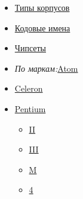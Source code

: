 \documentclass[a4paper,11pt]{article}
\begin{document}
\begin{tabular}
\begin{tabular}
\begin{itemize}
	\item \href{https://ru.wikipedia.org/wiki/%D0%A2%D0%B8%D0%BF%D1%8B_%D0%BA%D0%BE%D1%80%D0%BF%D1%83%D1%81%D0%BE%D0%B2_%D0%BF%D1%80%D0%BE%D1%86%D0%B5%D1%81%D1%81%D0%BE%D1%80%D0%BE%D0%B2}{Типы корпусов}
	\item \href{https://ru.wikipedia.org/wiki/%D0%A1%D0%BF%D0%B8%D1%81%D0%BE%D0%BA_%D0%BA%D0%BE%D0%B4%D0%BE%D0%B2%D1%8B%D1%85_%D0%B8%D0%BC%D1%91%D0%BD_%D0%BF%D1%80%D0%BE%D0%B4%D1%83%D0%BA%D1%86%D0%B8%D0%B8_Intel}{Кодовые имена}
	\item \href{https://ru.wikipedia.org/wiki/%D0%A1%D0%BF%D0%B8%D1%81%D0%BE%D0%BA_%D1%87%D0%B8%D0%BF%D1%81%D0%B5%D1%82%D0%BE%D0%B2_Intel}{Чипсеты}
\end{itemize}
\begin{itemize}
	\item \textit{По маркам:}\href{https://ru.wikipedia.org/w/index.php?title=%D0%A1%D0%BF%D0%B8%D1%81%D0%BE%D0%BA_%D0%BC%D0%B8%D0%BA%D1%80%D0%BE%D0%BF%D1%80%D0%BE%D1%86%D0%B5%D1%81%D1%81%D0%BE%D1%80%D0%BE%D0%B2_Intel_Atom&amp;action=edit&amp;redlink=1}{Atom}
	\item \href{https://ru.wikipedia.org/wiki/%D0%A1%D0%BF%D0%B8%D1%81%D0%BE%D0%BA_%D0%BC%D0%B8%D0%BA%D1%80%D0%BE%D0%BF%D1%80%D0%BE%D1%86%D0%B5%D1%81%D1%81%D0%BE%D1%80%D0%BE%D0%B2_Celeron}{Celeron}
	\item \href{https://ru.wikipedia.org/wiki/%D0%A1%D0%BF%D0%B8%D1%81%D0%BE%D0%BA_%D0%BC%D0%B8%D0%BA%D1%80%D0%BE%D0%BF%D1%80%D0%BE%D1%86%D0%B5%D1%81%D1%81%D0%BE%D1%80%D0%BE%D0%B2_Pentium}{Pentium}
\begin{itemize}
	\item \href{https://ru.wikipedia.org/wiki/%D0%A1%D0%BF%D0%B8%D1%81%D0%BE%D0%BA_%D0%BC%D0%B8%D0%BA%D1%80%D0%BE%D0%BF%D1%80%D0%BE%D1%86%D0%B5%D1%81%D1%81%D0%BE%D1%80%D0%BE%D0%B2_Pentium_II}{II}
	\item \href{https://ru.wikipedia.org/w/index.php?title=%D0%A1%D0%BF%D0%B8%D1%81%D0%BE%D0%BA_%D0%BC%D0%B8%D0%BA%D1%80%D0%BE%D0%BF%D1%80%D0%BE%D1%86%D0%B5%D1%81%D1%81%D0%BE%D1%80%D0%BE%D0%B2_Pentium_III&amp;action=edit&amp;redlink=1}{III}
	\item \href{https://ru.wikipedia.org/w/index.php?title=%D0%A1%D0%BF%D0%B8%D1%81%D0%BE%D0%BA_%D0%BC%D0%B8%D0%BA%D1%80%D0%BE%D0%BF%D1%80%D0%BE%D1%86%D0%B5%D1%81%D1%81%D0%BE%D1%80%D0%BE%D0%B2_Pentium_M&amp;action=edit&amp;redlink=1}{M}
	\item \href{https://ru.wikipedia.org/wiki/%D0%A1%D0%BF%D0%B8%D1%81%D0%BE%D0%BA_%D0%BC%D0%B8%D0%BA%D1%80%D0%BE%D0%BF%D1%80%D0%BE%D1%86%D0%B5%D1%81%D1%81%D0%BE%D1%80%D0%BE%D0%B2_Pentium_4}{4}

\end{itemize}
\end{itemize}
\end{tabular}
\end{tabular}
\end{document}
